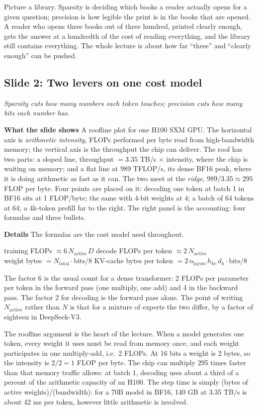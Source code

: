 \documentclass[11pt,letterpaper]{article}
\newcommand{\slide}[3]{%
  \subsection[Slide #1: #2]{Slide #1: #2}%
  {\color{muted}\itshape #3\par}\medskip}
\newcommand{\para}[1]{\medskip\noindent\textbf{#1}\quad}
\newenvironment{intuition}{\begin{tcolorbox}[intuitionbox]}{\end{tcolorbox}}
\newenvironment{formulas}{\begin{tcolorbox}[formulabox]}{\end{tcolorbox}}
\newcommand{\Nact}{N_{\mathrm{active}}}
\newcommand{\Ntot}{N_{\mathrm{total}}}\newcommand{\Neff}{N_{\mathrm{eff}}}
\begin{document}
\begin{intuition}
Picture a library. Sparsity is deciding which books a reader actually opens for a given question; precision is how legible the print is in the books that are opened. A reader who opens three books out of three hundred, printed clearly enough, gets the answer at a hundredth of the cost of reading everything, and the library still contains everything. The whole lecture is about how far ``three'' and ``clearly enough'' can be pushed.
\end{intuition}

\slide{2}{Two levers on one cost model}{Sparsity cuts how many numbers each token touches; precision cuts how many bits each number has.}

\para{What the slide shows} A roofline plot for one H100 SXM GPU. The horizontal axis is \emph{arithmetic intensity}, FLOPs performed per byte read from high-bandwidth memory; the vertical axis is the throughput the chip can deliver. The roof has two parts: a sloped line, throughput $=3.35$ TB/s $\times$ intensity, where the chip is waiting on memory; and a flat line at 989 TFLOP/s, its dense BF16 peak, where it is doing arithmetic as fast as it can. The two meet at the \emph{ridge}, $989/3.35\approx295$ FLOP per byte. Four points are placed on it: decoding one token at batch 1 in BF16 sits at 1 FLOP/byte; the same with 4-bit weights at 4; a batch of 64 tokens at 64; a 4k-token prefill far to the right. The right panel is the accounting: four formulas and three bullets.

\para{Details} The formulas are the cost model used throughout.
\begin{formulas}
training FLOPs $\approx 6\,\Nact\,D$ \qquad decode FLOPs per token $\approx 2\,\Nact$\\[3pt]
weight bytes $=\Ntot\cdot\text{bits}/8$ \qquad KV-cache bytes per token $=2\,n_{\text{layers}}\,h_{kv}\,d_h\cdot\text{bits}/8$
\end{formulas}
The factor 6 is the usual count for a dense transformer: 2 FLOPs per parameter per token in the forward pass (one multiply, one add) and 4 in the backward pass. The factor 2 for decoding is the forward pass alone. The point of writing $\Nact$ rather than $N$ is that for a mixture of experts the two differ, by a factor of eighteen in DeepSeek-V3.

The roofline argument is the heart of the lecture. When a model generates one token, every weight it uses must be read from memory once, and each weight participates in one multiply-add, i.e.\ 2 FLOPs. At 16 bits a weight is 2 bytes, so the intensity is $2/2=1$ FLOP per byte. The chip can multiply 295 times faster than that memory traffic allows: at batch 1, decoding uses about a third of a percent of the arithmetic capacity of an H100. The step time is simply (bytes of active weights)/(bandwidth): for a 70B model in BF16, 140 GB at 3.35 TB/s is about 42 ms per token, however little arithmetic is involved.
\end{document}
